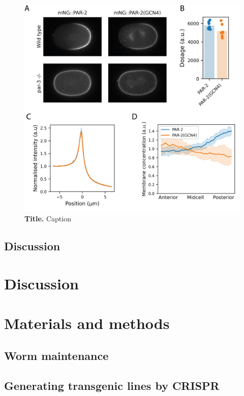 \documentclass[12pt]{"article"}
\newcommand{\mycaption}[2]{\caption[#1]{\textbf{#1.} #2}}
\begin{document}
\begin{figure}[!h]
\includegraphics[scale=0.95]{gcn4_par3mut}
\setlength{\abovecaptionskip}{20pt}
\centering
\mycaption{Title}{Caption}
\label{fig:gcn4_par3mut}
\end{figure}

\subsection{Discussion}



\clearpage
\section{Discussion}


\clearpage
\section{Materials and methods}


\subsection{Worm maintenance}
\subsection{Generating transgenic lines by CRISPR}
\end{document}
